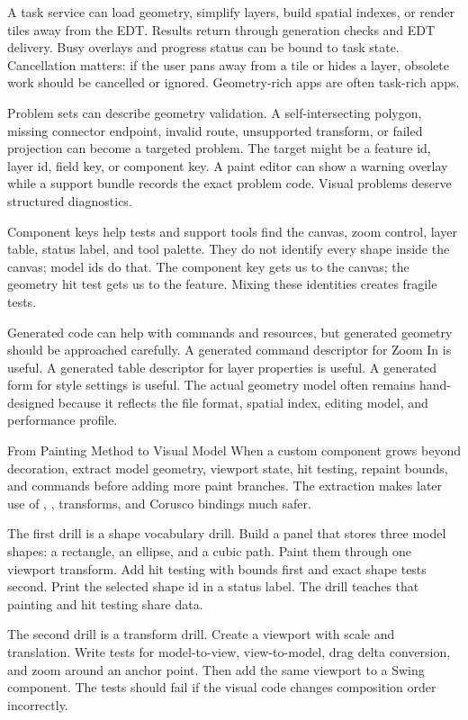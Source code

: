 A task service can load geometry, simplify layers, build spatial indexes, or render tiles away from the EDT. Results return through generation checks and EDT delivery. Busy overlays and progress status can be bound to task state. Cancellation matters: if the user pans away from a tile or hides a layer, obsolete work should be cancelled or ignored. Geometry-rich apps are often task-rich apps.

Problem sets can describe geometry validation. A self-intersecting polygon, missing connector endpoint, invalid route, unsupported transform, or failed projection can become a targeted problem. The target might be a feature id, layer id, field key, or component key. A paint editor can show a warning overlay while a support bundle records the exact problem code. Visual problems deserve structured diagnostics.

Component keys help tests and support tools find the canvas, zoom control, layer table, status label, and tool palette. They do not identify every shape inside the canvas; model ids do that. The component key gets us to the canvas; the geometry hit test gets us to the feature. Mixing these identities creates fragile tests.

Generated code can help with commands and resources, but generated geometry should be approached carefully. A generated command descriptor for Zoom In is useful. A generated table descriptor for layer properties is useful. A generated form for style settings is useful. The actual geometry model often remains hand-designed because it reflects the file format, spatial index, editing model, and performance profile.

\begin{migrationbox}{From Painting Method to Visual Model}
When a custom component grows beyond decoration, extract model geometry, viewport state, hit testing, repaint bounds, and commands before adding more paint branches. The extraction makes later use of , , transforms, and Corusco bindings much safer.
\end{migrationbox}

The first drill is a shape vocabulary drill. Build a panel that stores three model shapes: a rectangle, an ellipse, and a cubic path. Paint them through one viewport transform. Add hit testing with bounds first and exact shape tests second. Print the selected shape id in a status label. The drill teaches that painting and hit testing share data.

The second drill is a transform drill. Create a viewport with scale and translation. Write tests for model-to-view, view-to-model, drag delta conversion, and zoom around an anchor point. Then add the same viewport to a Swing component. The tests should fail if the visual code changes composition order incorrectly.

